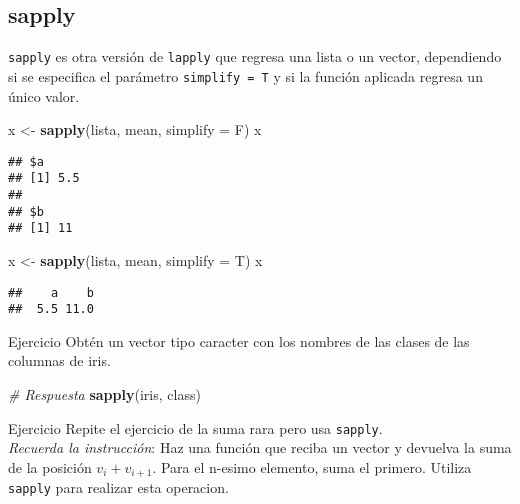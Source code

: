 \documentclass[]{article}
\newenvironment{Shaded}{\begin{snugshade}}{\end{snugshade}}
\newcommand{\KeywordTok}[1]{\textcolor[rgb]{0.13,0.29,0.53}{\textbf{#1}}}
\newcommand{\DataTypeTok}[1]{\textcolor[rgb]{0.13,0.29,0.53}{#1}}
\newcommand{\StringTok}[1]{\textcolor[rgb]{0.31,0.60,0.02}{#1}}
\newcommand{\CommentTok}[1]{\textcolor[rgb]{0.56,0.35,0.01}{\textit{#1}}}
\newcommand{\NormalTok}[1]{#1}
\begin{document}
\subsection{sapply}\label{sapply}

\texttt{sapply} es otra versión de \texttt{lapply} que regresa una lista
o un vector, dependiendo si se especifica el parámetro
\texttt{simplify\ =\ T} y si la función aplicada regresa un único valor.

\begin{Shaded}
\begin{Highlighting}[]
\NormalTok{x <-}\StringTok{ }\KeywordTok{sapply}\NormalTok{(lista, mean, }\DataTypeTok{simplify =}\NormalTok{ F)}
\NormalTok{x}
\end{Highlighting}
\end{Shaded}

\begin{verbatim}
## $a
## [1] 5.5
## 
## $b
## [1] 11
\end{verbatim}

\begin{Shaded}
\begin{Highlighting}[]
\NormalTok{x <-}\StringTok{ }\KeywordTok{sapply}\NormalTok{(lista, mean, }\DataTypeTok{simplify =}\NormalTok{ T)}
\NormalTok{x}
\end{Highlighting}
\end{Shaded}

\begin{verbatim}
##    a    b 
##  5.5 11.0
\end{verbatim}

\renewcommand\bcStyleTitre[1]{\large\textcolor{bbblack}{#1}}

\begin{bclogo}[
  couleur=llred,
  arrondi=0,
  logo=\bcstop,
  barre=none,
  noborder=true]{Ejercicio}
Obtén un vector tipo caracter con los nombres de las clases de 
las columnas de iris.
\end{bclogo}

\begin{Shaded}
\begin{Highlighting}[]
\CommentTok{# Respuesta}
\KeywordTok{sapply}\NormalTok{(iris, class)}
\end{Highlighting}
\end{Shaded}

\renewcommand\bcStyleTitre[1]{\large\textcolor{bbblack}{#1}}

\begin{bclogo}[
  couleur=llred,
  arrondi=0,
  logo=\bcstop,
  barre=none,
  noborder=true]{Ejercicio}
Repite el ejercicio de la suma rara pero usa \texttt{sapply}.\\

\textit{Recuerda la instrucción}: Haz una función que reciba un vector y devuelva 
la suma de la posición $v_i + v_{i + 1}$. Para el n-esimo elemento, 
suma el primero. Utiliza \texttt{sapply} para realizar esta operacion.
\end{bclogo}
\end{document}
